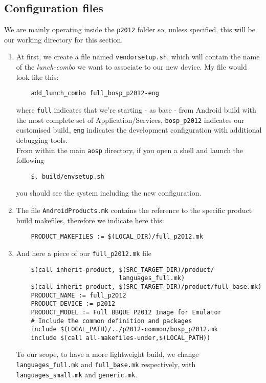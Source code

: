 \subsection{Configuration files}
\label{configuration}
We are mainly operating inside the \texttt{p2012} folder so, unless specified, this will be our working directory for this section.
\begin{enumerate}
\item \label{item-and-vendors} At first, we create a file named \texttt{vendorsetup.sh}, which will contain the name of the \textit{lunch-combo} we want to associate to our new device. My file would look like this:
\begin{verbatim}
	add_lunch_combo full_bosp_p2012-eng
\end{verbatim}
where \texttt{full} indicates that we're starting - as base - from Android build with the most complete set of Application/Services, \texttt{bosp\_p2012} indicates our customised build, \texttt{eng} indicates the development configuration with additional debugging tools.\\
From within the main \texttt{aosp} directory, if you open a shell and launch the following
\begin{verbatim}
	$. build/envsetup.sh
\end{verbatim}
you should see the system including the new configuration.
\item \label{item-and-prod} The file \texttt{AndroidProducts.mk} contains the reference to the specific product build makefiles, therefore we indicate here this:
\begin{verbatim}
	PRODUCT_MAKEFILES := $(LOCAL_DIR)/full_p2012.mk
\end{verbatim}
\item \label{item-and-makefile} And here a piece of our \texttt{full\_p2012.mk} file
\begin{verbatim}
	$(call inherit-product, $(SRC_TARGET_DIR)/product/
	                        languages_full.mk)
	$(call inherit-product, $(SRC_TARGET_DIR)/product/full_base.mk)
	PRODUCT_NAME := full_p2012
	PRODUCT_DEVICE := p2012
	PRODUCT_MODEL := Full BBQUE P2012 Image for Emulator
	# Include the common definition and packages
	include $(LOCAL_PATH)/../p2012-common/bosp_p2012.mk
	include $(call all-makefiles-under,$(LOCAL_PATH))
\end{verbatim}
To our scope, to have a more lightweight build, we change \texttt{languages\_full.mk} and \texttt{full\_base.mk} respectively, with \texttt{languages\_small.mk} and \texttt{generic.mk}.\\

\end{enumerate}
